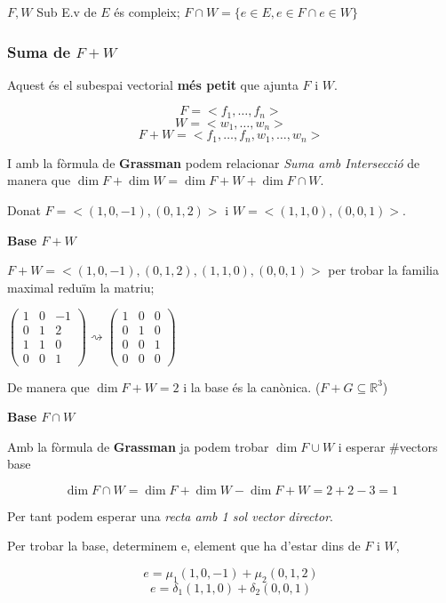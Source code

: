 \documentclass[12pt]{article}
\newcommand{\R}{\mathbb{R}}
\begin{document}
$F, W$ Sub E.v de $E$ és compleix; $F \cap W = \{e\in E, e\in F \cap e\in W\}$

\subsubsection{Suma de \texorpdfstring{$F + W$}{F + W}}

Aquest és el subespai vectorial \textbf{més petit} que ajunta $F \text{ i } W$.

\[F = <f_1 , \dots, f_n>\]
\[W = <w_1, \dots, w_n>\]
\[F + W = <f_1 , \dots, f_n, w_1, \dots, w_n>\]

I amb la fòrmula de \textbf{Grassman} podem relacionar \textit{Suma amb Intersecció} de manera que $\dim F + \dim W = \dim F+W + \dim F \cap W$.

\begin{examplebox}{}
    Donat $F = <(1,0,-1),(0,1,2)>$ i $W = <(1,1,0), (0,0,1)>$.

    \textbf{Base $F+W$}

    $F + W = <(1,0,-1),(0,1,2),(1,1,0),(0,0,1)>$ per trobar la familia maximal reduïm la matriu;
    
    $\begin{pmatrix}
        1 & 0 & -1\\
        0 & 1 & 2 \\
        1 & 1 & 0\\
        0 & 0 & 1
    \end{pmatrix} \rightsquigarrow \begin{pmatrix}
        1 & 0 & 0\\
        0 & 1 & 0 \\
        0 & 0 & 1\\
        0 & 0 & 0
    \end{pmatrix}$

    De manera que $\dim F+ W = 2$ i la base és la canònica. ($F+G \subseteq \R^3$)

    \textbf{Base $F \cap W$}

    Amb la fòrmula de \textbf{Grassman} ja podem trobar $\dim F\cup W$ i esperar \#vectors base

    \[\dim F \cap W = \dim F + \dim W - \dim F + W = 2 + 2 - 3 = 1\]

    Per tant podem esperar una \textit{recta amb 1 sol vector director}.

    Per trobar la base, determinem e, element que ha d'estar dins de $F$ i $W$,

    \[e = \mu_1 (1,0,-1) + \mu_2(0,1,2)\]
    \[e = \delta_1 (1,1,0) + \delta_2(0,0,1)\]


\end{examplebox}
\end{document}
